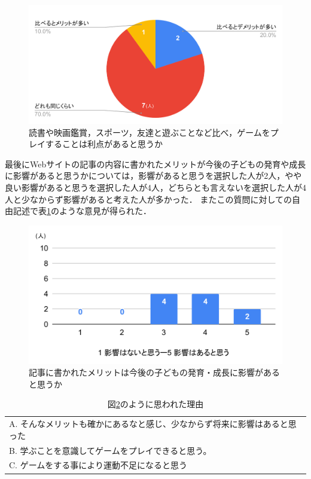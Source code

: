 \documentclass[12pt,a4j,titlepage]{ltjsarticle}
\begin{document}
\begin{figure}[H]
 \begin{center}
  \includegraphics[keepaspectratio, scale=0.5]{比較後.pdf}
 \end{center}
 \caption{読書や映画鑑賞，スポーツ，友達と遊ぶことなど比べ，ゲームをプレイすることは利点があると思うか}
 \label{fig:比較後}
\end{figure}

最後にWebサイトの記事の内容に書かれたメリットが今後の子どもの発育や成長に影響があると思うかについては，影響があると思うを選択した人が2人，やや良い影響があると思うを選択した人が4人，どちらとも言えないを選択した人が4人と少なからず影響があると考えた人が多かった．
またこの質問に対しての自由記述で表\ref{table:記事影響}のような意見が得られた．

\begin{figure}[H]
 \begin{center}
  \includegraphics[keepaspectratio, scale=0.5]{記事影響.pdf}
 \end{center}
 \caption{記事に書かれたメリットは今後の子どもの発育・成長に影響があると思うか}
 \label{fig:記事影響}
\end{figure}

\begin{table}[H]
 \caption{図\ref{fig:記事影響}のように思われた理由}
 \label{table:記事影響}
 \small
 \centering
  \begin{tabular}{l}
  \hline
   A. そんなメリットも確かにあるなと感じ、少なからず将来に影響はあると思った\\
   B. 学ぶことを意識してゲームをプレイできると思う。 \\
   C. ゲームをする事により運動不足になると思う \\
   \hline
  \end{tabular}
\end{table}
\end{document}
